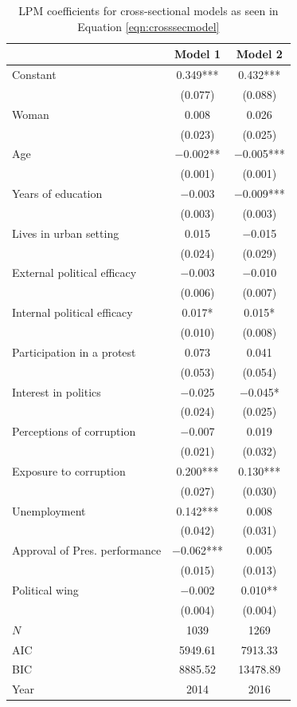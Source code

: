 \documentclass[12pt,a4]{article}\usepackage[]{graphicx}\usepackage[]{xcolor}
\begin{document}
\begin{table}[htbp]
\begin{center}
\caption{LPM coefficients for cross-sectional models as seen in Equation \ref{eqn:crosssecmodel}}
\label{tab:complexmodlpmcross}

\begin{tabular}[t]{lcc}
\toprule
  & Model 1 & Model 2\\
\midrule
Constant & \num{0.349}*** & \num{0.432}***\\
 & (\num{0.077}) & (\num{0.088})\\
Woman & \num{0.008} & \num{0.026}\\
 & (\num{0.023}) & (\num{0.025})\\
Age & \num{-0.002}** & \num{-0.005}***\\
 & (\num{0.001}) & (\num{0.001})\\
Years of education & \num{-0.003} & \num{-0.009}***\\
 & (\num{0.003}) & (\num{0.003})\\
Lives in urban setting & \num{0.015} & \num{-0.015}\\
 & (\num{0.024}) & (\num{0.029})\\
External political efficacy & \num{-0.003} & \num{-0.010}\\
 & (\num{0.006}) & (\num{0.007})\\
Internal political efficacy & \num{0.017}* & \num{0.015}*\\
 & (\num{0.010}) & (\num{0.008})\\
Participation in a protest & \num{0.073} & \num{0.041}\\
 & (\num{0.053}) & (\num{0.054})\\
Interest in politics & \num{-0.025} & \num{-0.045}*\\
 & (\num{0.024}) & (\num{0.025})\\
Perceptions of corruption & \num{-0.007} & \num{0.019}\\
 & (\num{0.021}) & (\num{0.032})\\
Exposure to corruption & \num{0.200}*** & \num{0.130}***\\
 & (\num{0.027}) & (\num{0.030})\\
Unemployment & \num{0.142}*** & \num{0.008}\\
 & (\num{0.042}) & (\num{0.031})\\
Approval of Pres. performance & \num{-0.062}*** & \num{0.005}\\
 & (\num{0.015}) & (\num{0.013})\\
Political wing & \num{-0.002} & \num{0.010}**\\
 & (\num{0.004}) & (\num{0.004})\\
\midrule
$N$ & \num{1039} & \num{1269}\\
AIC & \num{5949.61} & \num{7913.33}\\
BIC & \num{8885.52} & \num{13478.89}\\
Year & 2014 & 2016\\
\bottomrule
\end{tabular}



\end{center}
\end{table}
\end{document}
